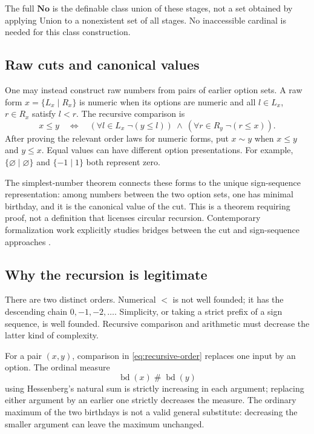 \documentclass[11pt,letterpaper]{article}
\theoremstyle{definition}
\theoremstyle{remark}
\newcommand{\No}{\mathbf{No}}
\newcommand{\bday}{\operatorname{bd}}
\numberwithin{equation}{section}
\begin{document}
The full \(\No\) is the definable class union of these stages, not a set obtained by applying Union to a nonexistent set of all stages. No inaccessible cardinal is needed for this class construction.

\subsection{Raw cuts and canonical values}
One may instead construct raw numbers from pairs of earlier option sets. A raw form \(x=\{L_x\mid R_x\}\) is numeric when its options are numeric and all \(l\in L_x\), \(r\in R_x\) satisfy \(l<r\). The recursive comparison is
\begin{equation}\label{eq:recursive-order}
 x\le y\quad\Longleftrightarrow\quad
 (\forall l\in L_x\;\neg(y\le l))\ \land\
 (\forall r\in R_y\;\neg(r\le x)).
\end{equation}
After proving the relevant order laws for numeric forms, put
\(x\sim y\) when \(x\le y\) and \(y\le x\). Equal values can have different option presentations. For example, \(\{\varnothing\mid\varnothing\}\) and \(\{-1\mid1\}\) both represent zero.

The simplest-number theorem connects these forms to the unique sign-sequence representation: among numbers between the two option sets, one has minimal birthday, and it is the canonical value of the cut. This is a theorem requiring proof, not a definition that licenses circular recursion. Contemporary formalization work explicitly studies bridges between the cut and sign-sequence approaches \cite{PakKaliszyk}.

\subsection{Why the recursion is legitimate}
There are two distinct orders. Numerical \(<\) is not well founded; it has the descending chain \(0,-1,-2,\ldots\). Simplicity, or taking a strict prefix of a sign sequence, is well founded. Recursive comparison and arithmetic must decrease the latter kind of complexity.

For a pair \((x,y)\), comparison in \eqref{eq:recursive-order} replaces one input by an option. The ordinal measure
\[
 \bday(x)\mathbin{\#}\bday(y)
\]
using Hessenberg's natural sum is strictly increasing in each argument; replacing either argument by an earlier one strictly decreases the measure. The ordinary maximum of the two birthdays is not a valid general substitute: decreasing the smaller argument can leave the maximum unchanged.
\end{document}
